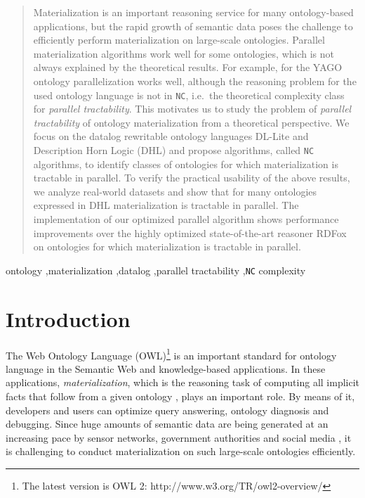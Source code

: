 \documentclass[final,1p,times]{elsarticle}
\begin{document}
\begin{frontmatter}
\begin{abstract}
  Materialization is an important reasoning service for many
  ontology-based applications, but the rapid growth of semantic data
  poses the challenge to efficiently perform materialization on
  large-scale ontologies. Parallel materialization algorithms work
  well for some ontologies, which is not always explained by the
  theoretical results. For example, for the YAGO ontology
  parallelization works well, although the reasoning problem for the
  used ontology language is not in \texttt{NC}, i.e.\ the theoretical
  complexity class for \emph{parallel tractability}. This motivates us
  to study the problem of \emph{parallel tractability} of ontology
  materialization from a theoretical perspective. We focus on the
  datalog rewritable ontology languages DL-Lite and Description Horn
  Logic (DHL) and propose algorithms, called \texttt{NC} algorithms,
  to identify classes of ontologies for which materialization is
  tractable in parallel. To verify the practical usability of the
  above results, we analyze real-world datasets and show that for many
  ontologies expressed in DHL materialization is tractable in
  parallel. The implementation of our optimized parallel algorithm
  shows performance improvements over the highly optimized
  state-of-the-art reasoner RDFox on ontologies for which
  materialization is tractable in parallel.
\end{abstract}

\begin{keyword}
ontology \sep materialization \sep datalog \sep parallel tractability \sep \texttt{NC} complexity
\end{keyword}

\end{frontmatter}



\section{Introduction}
\label{sec:introduction}

The Web Ontology Language (OWL)\footnote{The latest version is OWL 2: http://www.w3.org/TR/owl2-overview/}
is an important standard for ontology language in the Semantic Web and knowledge-based applications.
In these applications, \emph{materialization}, which is the reasoning task of computing all implicit
facts that follow from a given ontology \cite{handbook}, plays an important role. By means of it, developers and users
can optimize query answering, ontology diagnosis and debugging. Since huge amounts of semantic data
are being generated at an increasing pace by sensor networks, government authorities and social
media \cite{LehmbergRMB16,MeuselBP15}, it is challenging to conduct materialization on such large-scale ontologies efficiently.
\end{document}

